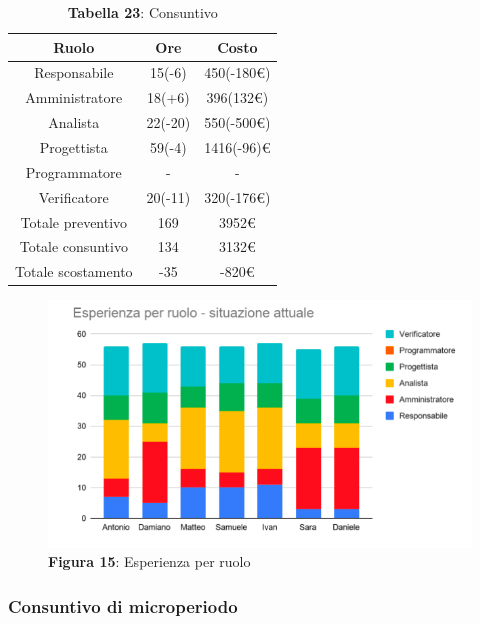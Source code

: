 \begin{table}[H]
	\centering
	\renewcommand{\arraystretch}{1.5}
	\begin{tabular}{|c|c|c|}
		\hline
		\rowcolor{lighter-grayer}
		Ruolo & Ore & Costo \\ \hline
		Responsabile & 15(-6) & 450(-180\euro) \\ \hline
		Amministratore & 18(+6) & 396(132\euro) \\ \hline
		Analista & 22(-20) & 550(-500\euro) \\ \hline
		Progettista & 59(-4) & 1416(-96)\euro \\ \hline
		Programmatore & - & - \\ \hline
		Verificatore & 20(-11) & 320(-176\euro) \\ \hline
		Totale preventivo & 169 & 3952\euro \\ \hline
		Totale consuntivo & 134 & 3132\euro \\ \hline
		Totale scostamento & -35 & -820\euro \\ \hline
	\end{tabular}
	\caption*{\textbf{Tabella 23}: Consuntivo\\}
\end{table}
\begin{figure}[H]
	\centering
	\includegraphics[width=15cm]{res/images/GraficoRuoli.png}
	\caption*{\textbf{Figura 15}: Esperienza per ruolo}
	\label{fig:Esperienza per ruolo}
\end{figure}

\subsubsection{Consuntivo di microperiodo}
